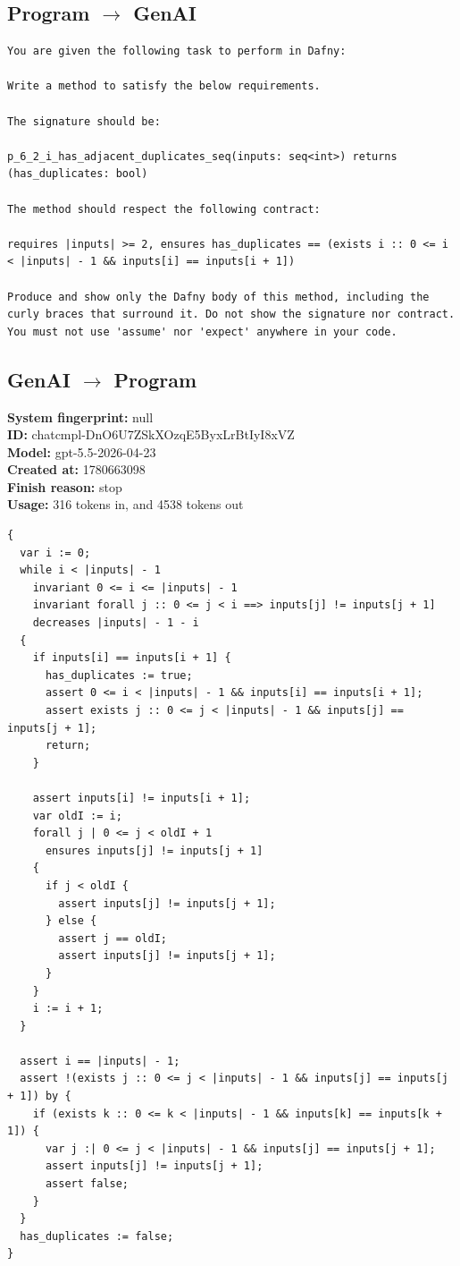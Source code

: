 \documentclass{article}
\begin{document}
\subsection*{Program $\rightarrow$ GenAI}
\begin{lstlisting}
You are given the following task to perform in Dafny:

Write a method to satisfy the below requirements.

The signature should be:

p_6_2_i_has_adjacent_duplicates_seq(inputs: seq<int>) returns (has_duplicates: bool)

The method should respect the following contract:

requires |inputs| >= 2, ensures has_duplicates == (exists i :: 0 <= i < |inputs| - 1 && inputs[i] == inputs[i + 1])

Produce and show only the Dafny body of this method, including the curly braces that surround it. Do not show the signature nor contract. You must not use 'assume' nor 'expect' anywhere in your code.
\end{lstlisting}
\subsection*{GenAI $\rightarrow$ Program}
\textbf{System fingerprint: }null
\\\textbf{ID: }chatcmpl-DnO6U7ZSkXOzqE5ByxLrBtIyI8xVZ
\\\textbf{Model: }gpt-5.5-2026-04-23
\\\textbf{Created at: }1780663098
\\\textbf{Finish reason: }stop
\\\textbf{Usage: }316 tokens in, and 4538 tokens out
\begin{lstlisting}
{
  var i := 0;
  while i < |inputs| - 1
    invariant 0 <= i <= |inputs| - 1
    invariant forall j :: 0 <= j < i ==> inputs[j] != inputs[j + 1]
    decreases |inputs| - 1 - i
  {
    if inputs[i] == inputs[i + 1] {
      has_duplicates := true;
      assert 0 <= i < |inputs| - 1 && inputs[i] == inputs[i + 1];
      assert exists j :: 0 <= j < |inputs| - 1 && inputs[j] == inputs[j + 1];
      return;
    }

    assert inputs[i] != inputs[i + 1];
    var oldI := i;
    forall j | 0 <= j < oldI + 1
      ensures inputs[j] != inputs[j + 1]
    {
      if j < oldI {
        assert inputs[j] != inputs[j + 1];
      } else {
        assert j == oldI;
        assert inputs[j] != inputs[j + 1];
      }
    }
    i := i + 1;
  }

  assert i == |inputs| - 1;
  assert !(exists j :: 0 <= j < |inputs| - 1 && inputs[j] == inputs[j + 1]) by {
    if (exists k :: 0 <= k < |inputs| - 1 && inputs[k] == inputs[k + 1]) {
      var j :| 0 <= j < |inputs| - 1 && inputs[j] == inputs[j + 1];
      assert inputs[j] != inputs[j + 1];
      assert false;
    }
  }
  has_duplicates := false;
}
\end{lstlisting}
\end{document}
